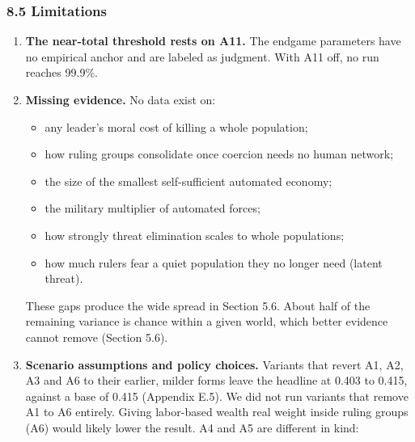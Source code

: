 \documentclass[
  10pt,
]{article}
\providecommand{\tightlist}{%
  \setlength{\itemsep}{0pt}\setlength{\parskip}{0pt}}
\begin{document}
\subsubsection{8.5 Limitations}\label{limitations}

\begin{enumerate}
\def\labelenumi{\arabic{enumi}.}
\tightlist
\item
  \textbf{The near-total threshold rests on A11.} The endgame parameters have no empirical anchor
  and are labeled as judgment. With A11 off, no run reaches 99.9\%.
\item
  \textbf{Missing evidence.} No data exist on:

  \begin{itemize}
  \tightlist
  \item
    any leader's moral cost of killing a whole population;
  \item
    how ruling groups consolidate once coercion needs no human network;
  \item
    the size of the smallest self-sufficient automated economy;
  \item
    the military multiplier of automated forces;
  \item
    how strongly threat elimination scales to whole populations;
  \item
    how much rulers fear a quiet population they no longer need (latent threat).
  \end{itemize}

  These gaps produce the wide spread in Section 5.6. About half of the remaining variance is chance
  within a given world, which better evidence cannot remove (Section 5.6).
\item
  \textbf{Scenario assumptions and policy choices.} Variants that revert A1, A2, A3 and A6 to their
  earlier, milder forms leave the headline at 0.403 to 0.415, against a base of 0.415 (Appendix
  E.5). We did not run variants that remove A1 to A6 entirely. Giving labor-based wealth real weight
  inside ruling groups (A6) would likely lower the result. A4 and A5 are different in kind:


\end{enumerate}
\end{document}

